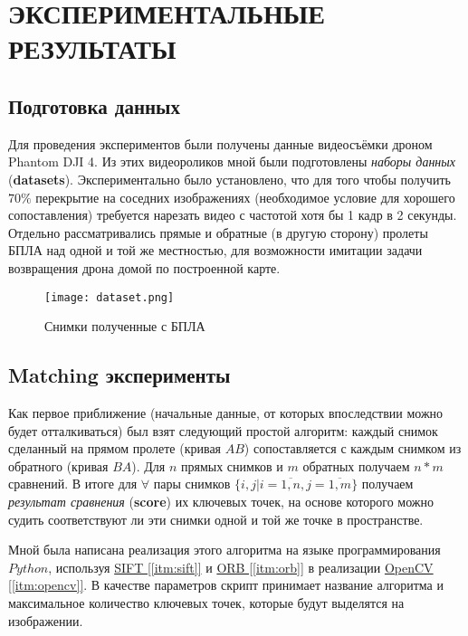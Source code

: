 \chapter{ЭКСПЕРИМЕНТАЛЬНЫЕ РЕЗУЛЬТАТЫ}

\section{Подготовка данных}

Для проведения экспериментов были получены данные видеосъёмки дроном Phantom DJI 4. Из этих видеороликов мной были подготовлены \textit{наборы данных} (\textbf{datasets}). Экспериментально было установлено, что для того чтобы получить $70\%$ перекрытие на соседних изображениях (необходимое условие для хорошего сопоставления) требуется нарезать видео с частотой хотя бы 1 кадр в 2 секунды. Отдельно рассматривались прямые и обратные (в другую сторону) пролеты БПЛА над одной и той же местностью, для возможности имитации задачи возвращения дрона домой по построенной карте.

\begin{figure}[h]
    \centering
    \texttt{[image: dataset.png]}
    \caption{Снимки полученные с БПЛА}
    \label{fig:dataset}
\end{figure}

\section{Matching эксперименты}

Как первое приближение (начальные данные, от которых впоследствии можно будет отталкиваться) был взят следующий простой алгоритм: каждый снимок сделанный на прямом пролете (кривая $AB$) сопоставляется с каждым снимком из обратного (кривая $BA$). Для $n$ прямых снимков и $m$ обратных получаем $n*m$ сравнений. В итоге для $\forall$ пары снимков $\{i, j | i=\overline{1,n}, j=\overline{1,m}\}$ получаем \textit{результат сравнения} (\textbf{score}) их ключевых точек, на основе которого можно судить соответствуют ли эти снимки одной и той же точке в пространстве.

Мной была написана реализация этого алгоритма на языке программирования $Python$, используя \hyperref[itm:sift]{SIFT [\ref{itm:sift}]} и \hyperref[itm:orb]{ORB [\ref{itm:orb}]} в реализации \hyperref[itm:opencv]{OpenCV [\ref{itm:opencv}]}. В качестве параметров скрипт принимает название алгоритма и максимальное количество ключевых точек, которые будут выделятся на изображении.

